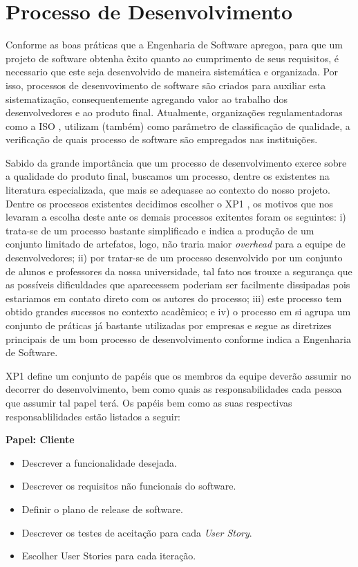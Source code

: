 \chapter{Processo de Desenvolvimento}

Conforme as boas práticas que a Engenharia de Software apregoa, para que um projeto de software obtenha êxito quanto ao cumprimento de seus requisitos, é necessario que este seja desenvolvido de maneira sistemática e organizada. Por isso, processos de desenvovimento de software são criados para auxiliar esta sistematização, consequentemente agregando valor ao trabalho dos desenvolvedores e ao produto final. Atualmente, organizações regulamentadoras como a ISO \cite{iso}, utilizam (também) como parâmetro de classificação de qualidade, a verificação de quais processo de software são empregados nas instituições.

Sabido da grande importância que um processo de desenvolvimento exerce sobre a qualidade do produto final, buscamos um processo, dentre os existentes na literatura especializada, que mais se adequasse ao contexto do nosso projeto. Dentre os processos existentes decidimos escolher o XP1 \cite{xp1}, os motivos que nos levaram a escolha deste ante os demais processos exitentes foram os seguintes: i) trata-se de um processo bastante simplificado e indica a produção de um conjunto limitado de artefatos, logo, não traria maior \textit{overhead} para a equipe de desenvolvedores; ii) por tratar-se de um processo desenvolvido por um conjunto de alunos e professores da nossa universidade, tal fato nos trouxe a segurança que as possíveis dificuldades que aparecessem poderiam ser facilmente dissipadas pois estariamos em contato direto com os autores do processo; iii) este processo tem obtido grandes sucessos no contexto acadêmico; e iv) o processo em si agrupa um conjunto de práticas já bastante utilizadas por empresas e segue as diretrizes principais de um bom processo de desenvolvimento conforme indica a Engenharia de Software.

XP1 define um conjunto de papéis que os membros da equipe deverão assumir no decorrer do desenvolvimento, bem como quais as responsabilidades  cada pessoa que assumir tal papel terá. Os papéis bem como as suas respectivas responsablilidades estão listados a seguir:

\textbf{Papel: Cliente}
\begin{itemize}
 \item Descrever a funcionalidade desejada.
 \item Descrever os requisitos não funcionais do software.
 \item Definir o plano de release de software.
 \item Descrever os testes de aceitação para cada \textit{User Story}.
 \item Escolher User Stories para cada iteração.
\end{itemize}

